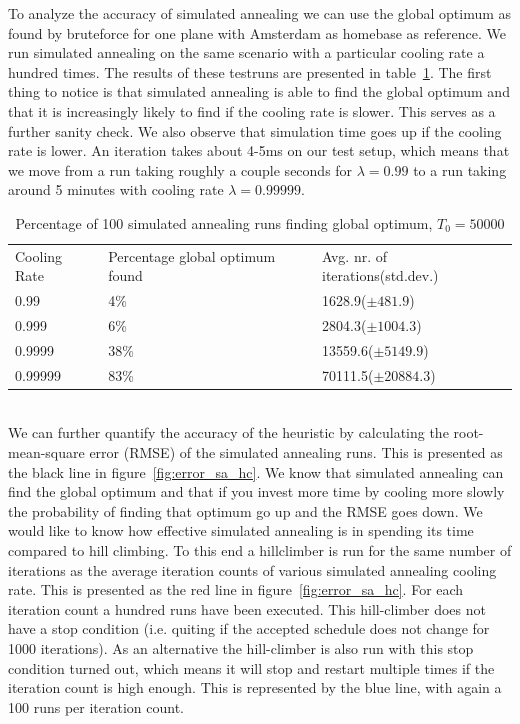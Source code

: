 \documentclass[journal]{IEEEtran}
\begin{document}
To analyze the accuracy of simulated annealing we can use the global optimum as found by bruteforce for one plane with Amsterdam as homebase as reference. We run simulated annealing on the same scenario with a particular cooling rate a hundred times. The results of these testruns are presented in table~\ref{tab:percentage_sa_optimal}. The first thing to notice is that simulated annealing is able to find the global optimum and that it is increasingly likely to find if the cooling rate is slower. This serves as a further sanity check. We also observe that simulation time goes up if the cooling rate is lower. An iteration takes about 4-5ms on our test setup, which means that we move from a run taking roughly a couple seconds for $\lambda=0.99$ to a run taking around 5 minutes with cooling rate $\lambda=0.99999$.
\begin{table}[h]
\centering
\begin{tabular}{lll}
Cooling Rate & Percentage global optimum found & Avg. nr. of iterations(std.dev.) \\
0.99         & 4\%  & 1628.9($\pm 481.9$) \\
0.999        & 6\%  & 2804.3($\pm 1004.3$) \\
0.9999       & 38\% & 13559.6($\pm 5149.9$)  \\
0.99999      & 83\% & 70111.5($\pm 20884.3$)
\end{tabular}
\caption{Percentage of 100 simulated annealing runs finding global optimum, $T_0 = \num{50000}$}
\label{tab:percentage_sa_optimal}
\end{table}
\\
We can further quantify the accuracy of the heuristic by calculating the root-mean-square error (RMSE) of the simulated annealing runs. This is presented as the black line in figure~\ref{fig:error_sa_hc}. We know that simulated annealing can find the global optimum and that if you invest more time by cooling more slowly the probability of finding that optimum go up and the RMSE goes down. We would like to know how effective simulated annealing is in spending its time compared to hill climbing. To this end a hillclimber is run for the same number of iterations as the average iteration counts of various simulated annealing cooling rate. This is presented as the red line in figure~\ref{fig:error_sa_hc}. For each iteration count a hundred runs have been executed. This hill-climber does not have a stop condition (i.e. quiting if the accepted schedule does not change for 1000 iterations). As an alternative the hill-climber is also run with this stop condition turned out, which means it will stop and restart multiple times if the iteration count is high enough. This is represented by the blue line, with again a 100 runs per iteration count.\\
\end{document}
